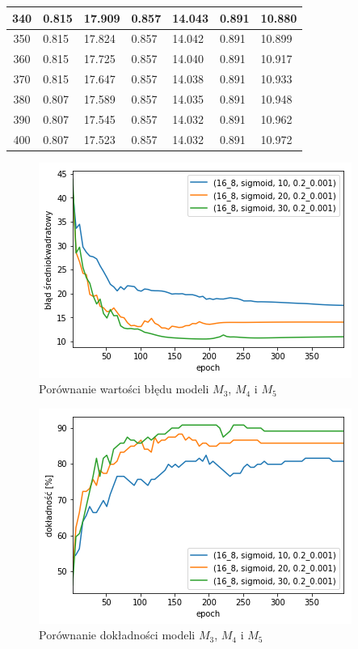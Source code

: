 \begin{longtable}{|c|l|l|l|l|l|l|}
        340 & 0.815 & 17.909 & 0.857 & 14.043 & 0.891 & 10.880 \\ \hline
        350 & 0.815 & 17.824 & 0.857 & 14.042 & 0.891 & 10.899 \\ \hline
        360 & 0.815 & 17.725 & 0.857 & 14.040 & 0.891 & 10.917 \\ \hline
        370 & 0.815 & 17.647 & 0.857 & 14.038 & 0.891 & 10.933 \\ \hline
        380 & 0.807 & 17.589 & 0.857 & 14.035 & 0.891 & 10.948 \\ \hline
        390 & 0.807 & 17.545 & 0.857 & 14.032 & 0.891 & 10.962 \\ \hline
        400 & 0.807 & 17.523 & 0.857 & 14.032 & 0.891 & 10.972 \\
    \end{longtable}

    \begin{figure}[h]
        \centering
        \includegraphics[scale=0.8]{./img/feat-error.png}
        \caption{Porównanie wartości błędu modeli $M_3$, $M_4$ i $M_5$}
    \end{figure}

    \begin{figure}[h]
        \centering
        \includegraphics[scale=0.8]{././img/feat-accuracy.png}
        \caption{Porównanie dokładności modeli $M_3$, $M_4$ i $M_5$}
    \end{figure}

